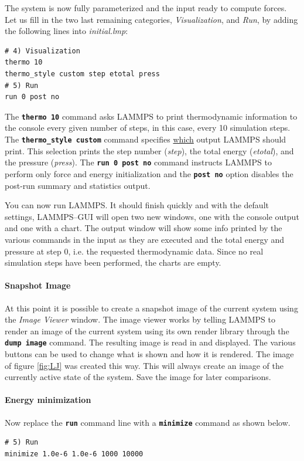 \documentclass[9pt,tutorial]{livecoms}
\renewcommand{\emph}[1]{\underline{#1}}
\newcommand{\lmpcmd}[1]{\texttt{\normalsize\bfseries\textcolor{command}{#1}}}
\begin{document}
The system is now fully parameterized and the input ready to compute
forces.  Let us fill in the two last remaining categories,
\textit{Visualization}, and \textit{Run}, by adding the following lines
into \textit{initial.lmp}:
\begin{lstlisting}
# 4) Visualization
thermo 10
thermo_style custom step etotal press
# 5) Run
run 0 post no
\end{lstlisting}

The \lmpcmd{thermo 10} command asks LAMMPS to print thermodynamic
information to the console every given number of steps, in this case,
every 10 simulation steps.  The \lmpcmd{thermo\_style custom} command
specifies \emph{which} output LAMMPS should print.  This selection
prints the step number (\textit{step}), the total energy
(\textit{etotal}), and the pressure (\textit{press}).  The \lmpcmd{run
  0 post no} command instructs LAMMPS to perform only force and energy
initialization and the \lmpcmd{post no} option disables the post-run
summary and statistics output.

You can now run LAMMPS.  It should finish quickly and with the default
settings, LAMMPS--GUI will open two new windows, one with the console
output and one with a chart.  The output window will show some info
printed by the various commands in the input as they are executed and
the total energy and pressure at step 0, i.e. the requested thermodynamic
data.  Since no real simulation steps have been performed, the charts
are empty.

\paragraph{Snapshot Image}

At this point it is possible to create a snapshot image of the
current system using the \textit{Image Viewer} window.  The image viewer
works by telling LAMMPS to render an image of the current system using
its own render library through the \lmpcmd{dump image} command.  The
resulting image is read in and displayed.  The various buttons can be
used to change what is shown and how it is rendered.  The image of
figure \ref{fig:LJ} was created this way.  This will always create an
image of the currently active state of the system.  Save the image for
later comparisons.

\paragraph{Energy minimization}
Now replace the \lmpcmd{run} command line with a \lmpcmd{minimize} command
as shown below.
\begin{lstlisting}
# 5) Run
minimize 1.0e-6 1.0e-6 1000 10000
\end{lstlisting}
\end{document}
